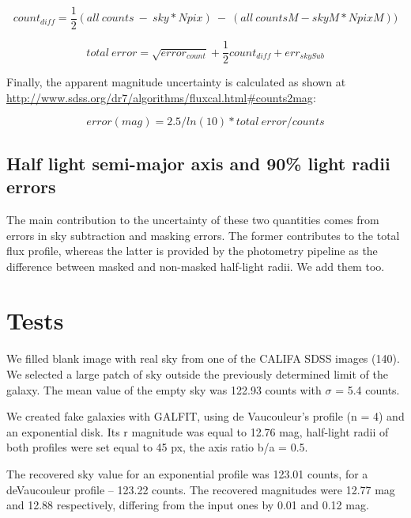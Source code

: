 \documentclass[apj, onecolumn]{emulateapj}
\begin{document}
\begin{equation}
count_{diff} = \frac{1}{2}(all\ counts\ -\ sky*Npix)\ -\ (all\ countsM - skyM*NpixM))
\end{equation}

\begin{equation}
total\ error = \sqrt{error_{count}} + \frac{1}{2} count_{diff} + err_{skySub}
\end{equation}

Finally, the apparent magnitude uncertainty is calculated as shown at \url{http://www.sdss.org/dr7/algorithms/fluxcal.html#counts2mag}:

\begin{equation}
error(mag) = 2.5 / ln(10) * total\ error / counts
\end{equation}

\subsection{Half light semi-major axis and 90\% light radii errors}

The main contribution to the uncertainty of these two quantities comes from errors in sky subtraction and masking errors. The former contributes to the total flux profile, whereas the latter is provided by the photometry pipeline as the difference between masked and non-masked half-light radii. We add them too.


\FloatBarrier
\section*{Tests}
We filled blank image with real sky from one of the CALIFA SDSS images (140). We selected a large patch of sky outside the previously determined limit of the galaxy. The mean value of the empty sky was 122.93 counts with $\sigma$ = 5.4 counts.

We created fake galaxies with GALFIT, using de Vaucouleur's profile (n = 4) and an exponential disk. Its r magnitude was equal to 12.76 mag, half-light radii of both profiles were set equal to 45 px, the axis ratio b/a = 0.5. 

The recovered sky value for an exponential profile was 123.01 counts, for a deVaucouleur profile -- 123.22 counts. The recovered magnitudes were 12.77 mag and 12.88 respectively, differing from the input ones by 0.01 and 0.12 mag.
\end{document}
